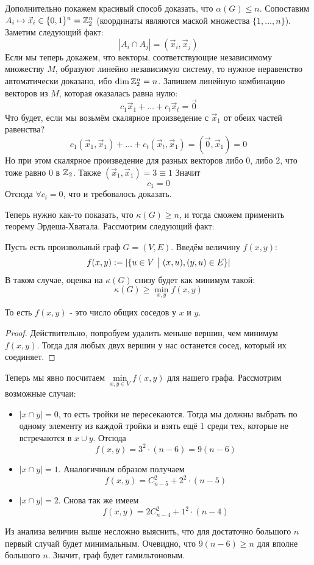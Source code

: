 \begin{example}
	Дополнительно покажем красивый способ доказать, что $\alpha(G) \le n$. Сопоставим $A_i \mapsto \vec{x}_i \in \{0, 1\}^n = \mathbb{Z}_2^n$ (координаты являются маской множества $\{1, \ldots, n\}$). Заметим следующий факт:
	\[
		|A_i \cap A_j| = (\vec{x}_i, \vec{x}_j)
	\]
	Если мы теперь докажем, что векторы, соответствующие независимому множеству $M$, образуют линейно независимую систему, то нужное неравенство автоматически доказано, ибо $\dim \mathbb{Z}_2^n = n$. Запишем линейную комбинацию векторов из $M$, которая оказалась равна нулю:
	\[
		c_1 \vec{x}_1 + \ldots + c_t \vec{x}_t = \vec{0}
	\]
	Что будет, если мы возьмём скалярное произведение с $\vec{x}_1$ от обеих частей равенства?
	\[
		c_1 (\vec{x}_1, \vec{x}_1) + \ldots + c_t (\vec{x}_t, \vec{x}_1) = (\vec{0}, \vec{x}_1) = 0
	\]
	Но при этом скалярное произведение для разных векторов либо 0, либо 2, что тоже равно 0 в $\mathbb{Z}_2$. Также $(\vec{x}_1, \vec{x}_1) = 3 \equiv 1$ Значит
	\[
		c_1 = 0
	\]
	Отсюда $\forall c_i = 0$, что и требовалось доказать.
	
	Теперь нужно как-то показать, что $\kappa(G) \ge n$, и тогда сможем применить теорему Эрдеша-Хватала. Рассмотрим следующий факт:
	\begin{proposition}
		Пусть есть произвольный граф $G = (V, E)$. Введём величину $f(x, y)$:
		\[
			f(x, y) := |\{u \in V \ \big|\  (x, u), (y, u) \in E\}|
		\]
		В таком случае, оценка на $\kappa(G)$ снизу будет как минимум такой:
		\[
			\kappa(G) \ge \min\limits_{x, y} f(x, y)
		\]
	\end{proposition}

	\begin{note}
		То есть $f(x, y)$ - это число общих соседов у $x$ и $y$.
	\end{note}

	\begin{proof}
		Действительно, попробуем удалить меньше вершин, чем минимум $f(x, y)$. Тогда для любых двух вершин у нас останется сосед, который их соединяет.
	\end{proof}

	Теперь мы явно посчитаем $\min\limits_{x, y \in V} f(x, y)$ для нашего графа. Рассмотрим возможные случаи:
	\begin{itemize}
		\item $|x \cap y| = 0$, то есть тройки не пересекаются. Тогда мы должны выбрать по одному элементу из каждой тройки и взять ещё 1 среди тех, которые не встречаются в $x \cup y$. Отсюда
		\[
			f(x, y) = 3^2 \cdot (n - 6) = 9(n - 6)
		\]
		
		\item $|x \cap y| = 1$. Аналогичным образом получаем
		\[
			f(x, y) = C_{n - 5}^2 + 2^2 \cdot (n - 5)
		\]
		
		\item $|x \cap y| = 2$. Снова так же имеем
		\[
			f(x, y) = 2C_{n - 4}^2 + 1^2 \cdot (n - 4)
		\]
	\end{itemize}
	Из анализа величин выше несложно выяснить, что для достаточно большого $n$ первый случай будет минимальным. Очевидно, что $9(n - 6) \ge n$ для вполне большого $n$. Значит, граф будет гамильтоновым.
\end{example}